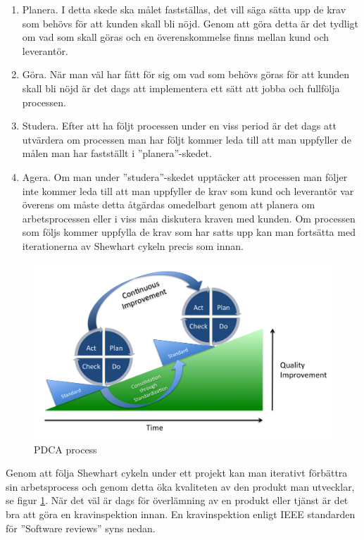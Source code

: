 \begin{enumerate}
  \item Planera. I detta skede ska målet fastställas, det vill säga sätta upp de krav som behövs för att kunden skall bli nöjd. Genom att göra detta är det tydligt om vad som skall göras och en överenskommelse finns mellan kund och leverantör. 
  \item Göra. När man väl har fått för sig om vad som behövs göras för att kunden skall bli nöjd är det dags att implementera ett sätt att jobba och fullfölja processen.
  \item Studera. Efter att ha följt processen under en viss period är det dags att utvärdera om processen man har följt kommer leda till att man uppfyller de målen man har fastställt i ''planera''-skedet.
  \item Agera. Om man under ''studera''-skedet upptäcker att processen man följer inte kommer leda till att man uppfyller de krav som kund och leverantör var överens om måste detta åtgärdas omedelbart genom att planera om arbetsprocessen eller i viss mån diskutera kraven med kunden. Om processen som följs kommer uppfylla de krav som har satts upp kan man fortsätta med iterationerna av Shewhart cykeln precis som innan.
\end{enumerate}
\begin{figure}[h]
\centerline{\includegraphics[scale=0.15]{ruben-tex/graphic/PDCA_Process}}
\caption{PDCA process \cite{Vietze}}
\label{fig:pdcaprocess}
\end{figure}
\noindent Genom att följa Shewhart cykeln under ett projekt kan man iterativt förbättra sin arbetsprocess och genom detta öka kvaliteten av den produkt man utvecklar, se figur \ref{fig:pdcaprocess}.
\newline
\newline
När det väl är dags för överlämning av en produkt eller tjänst är det bra att göra en kravinspektion innan. En kravinspektion enligt IEEE standarden för ''Software reviews'' syns nedan.

